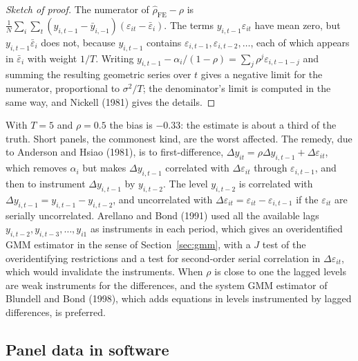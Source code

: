 \documentclass[11pt,a4paper]{article}
\numberwithin{equation}{section}
\theoremstyle{definition}
\begin{document}
\begin{proof}[Sketch of proof]
The numerator of $\hat\rho_{\text{FE}} - \rho$ is $\frac1N\sum_i\sum_t(y_{i,t-1} - \bar y_{i,-1})(\varepsilon_{it} - \bar\varepsilon_i)$. The terms $y_{i,t-1}\varepsilon_{it}$ have mean zero, but $y_{i,t-1}\bar\varepsilon_i$ does not, because $y_{i,t-1}$ contains
$\varepsilon_{i,t-1}, \varepsilon_{i,t-2}, \dots$, each of which appears in $\bar\varepsilon_i$ with weight $1/T$. Writing $y_{i,t-1} - \alpha_i/(1 - \rho) = \sum_j\rho^j\varepsilon_{i,t-1-j}$ and summing the resulting geometric series over $t$
gives a negative limit for the numerator, proportional to $\sigma^2/T$; the denominator's limit is computed in the same way, and Nickell (1981) gives the
details.
\end{proof}

With $T = 5$ and $\rho = 0.5$ the bias is $-0.33$: the estimate is about a third of the truth. Short panels, the commonest kind, are the worst affected. The
remedy, due to Anderson and Hsiao (1981), is to first-difference, $\Delta y_{it} = \rho\Delta y_{i,t-1} + \Delta\varepsilon_{it}$, which removes $\alpha_i$ but makes $\Delta y_{i,t-1}$ correlated with $\Delta\varepsilon_{it}$ through
$\varepsilon_{i,t-1}$, and then to instrument $\Delta y_{i,t-1}$ by $y_{i,t-2}$. The level $y_{i,t-2}$ is correlated with $\Delta y_{i,t-1} = y_{i,t-1} - y_{i,t-2}$, and uncorrelated with $\Delta\varepsilon_{it} = \varepsilon_{it} - \varepsilon_{i,t-1}$ if the $\varepsilon_{it}$
are serially uncorrelated. Arellano and Bond (1991) used all the available lags $y_{i,t-2}, y_{i,t-3}, \dots, y_{i1}$ as instruments in each period, which gives an overidentified
GMM estimator in the sense of Section~\ref{sec:gmm}, with a $J$ test of the overidentifying restrictions and a test for second-order serial correlation in $\Delta\varepsilon_{it}$, which
would invalidate the instruments. When $\rho$ is close to one the lagged levels are weak instruments for the differences, and the system GMM estimator of
Blundell and Bond (1998), which adds equations in levels instrumented by lagged differences, is preferred.

\subsection{Panel data in software}
\label{ssec:software16}
\end{document}
